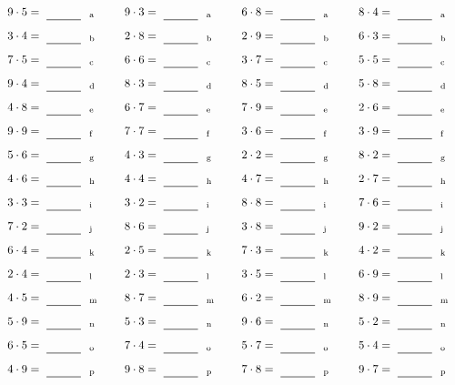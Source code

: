 \documentclass
[
  draft    = true,
  fontsize = 11pt,
  parskip  = half-
]
{scrartcl}
\begin{document}
\par\vfill\par
\begin{align*}
    \pline{9\cdot5}&=\rline{a}
  & \pline{9\cdot3}&=\rline{a}
  & \pline{6\cdot8}&=\rline{a}
  & \pline{8\cdot4}&=\rline{a} \\[1ex]
    \pline{3\cdot4}&=\rline{b}
  & \pline{2\cdot8}&=\rline{b}
  & \pline{2\cdot9}&=\rline{b}
  & \pline{6\cdot3}&=\rline{b} \\[1ex]
    \pline{7\cdot5}&=\rline{c}
  & \pline{6\cdot6}&=\rline{c}
  & \pline{3\cdot7}&=\rline{c}
  & \pline{5\cdot5}&=\rline{c} \\[1ex]
    \pline{9\cdot4}&=\rline{d}
  & \pline{8\cdot3}&=\rline{d}
  & \pline{8\cdot5}&=\rline{d}
  & \pline{5\cdot8}&=\rline{d} \\[1ex]
    \pline{4\cdot8}&=\rline{e}
  & \pline{6\cdot7}&=\rline{e}
  & \pline{7\cdot9}&=\rline{e}
  & \pline{2\cdot6}&=\rline{e} \\[1ex]
    \pline{9\cdot9}&=\rline{f}
  & \pline{7\cdot7}&=\rline{f}
  & \pline{3\cdot6}&=\rline{f}
  & \pline{3\cdot9}&=\rline{f} \\[1ex]
    \pline{5\cdot6}&=\rline{g}
  & \pline{4\cdot3}&=\rline{g}
  & \pline{2\cdot2}&=\rline{g}
  & \pline{8\cdot2}&=\rline{g} \\[1ex]
    \pline{4\cdot6}&=\rline{h}
  & \pline{4\cdot4}&=\rline{h}
  & \pline{4\cdot7}&=\rline{h}
  & \pline{2\cdot7}&=\rline{h} \\[1ex]
    \pline{3\cdot3}&=\rline{i}
  & \pline{3\cdot2}&=\rline{i}
  & \pline{8\cdot8}&=\rline{i}
  & \pline{7\cdot6}&=\rline{i} \\[1ex]
    \pline{7\cdot2}&=\rline{j}
  & \pline{8\cdot6}&=\rline{j}
  & \pline{3\cdot8}&=\rline{j}
  & \pline{9\cdot2}&=\rline{j} \\[1ex]
    \pline{6\cdot4}&=\rline{k}
  & \pline{2\cdot5}&=\rline{k}
  & \pline{7\cdot3}&=\rline{k}
  & \pline{4\cdot2}&=\rline{k} \\[1ex]
    \pline{2\cdot4}&=\rline{l}
  & \pline{2\cdot3}&=\rline{l}
  & \pline{3\cdot5}&=\rline{l}
  & \pline{6\cdot9}&=\rline{l} \\[1ex]
    \pline{4\cdot5}&=\rline{m}
  & \pline{8\cdot7}&=\rline{m}
  & \pline{6\cdot2}&=\rline{m}
  & \pline{8\cdot9}&=\rline{m} \\[1ex]
    \pline{5\cdot9}&=\rline{n}
  & \pline{5\cdot3}&=\rline{n}
  & \pline{9\cdot6}&=\rline{n}
  & \pline{5\cdot2}&=\rline{n} \\[1ex]
    \pline{6\cdot5}&=\rline{o}
  & \pline{7\cdot4}&=\rline{o}
  & \pline{5\cdot7}&=\rline{o}
  & \pline{5\cdot4}&=\rline{o} \\[1ex]
    \pline{4\cdot9}&=\rline{p}
  & \pline{9\cdot8}&=\rline{p}
  & \pline{7\cdot8}&=\rline{p}
  & \pline{9\cdot7}&=\rline{p}
\end{align*}
\end{document}
